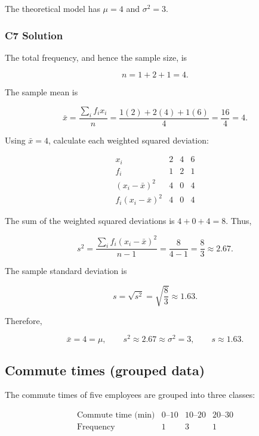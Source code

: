 The theoretical model has $\mu=4$ and $\sigma^2=3$.


\subsubsection*{C7 Solution}
\label{subsec:c7-only-frequency-solution}

The total frequency, and hence the sample size, is

\[
n=1+2+1=4.
\]

The sample mean is

\[
\bar{x}
=\frac{\sum_i f_i x_i}{n}
=\frac{1(2)+2(4)+1(6)}{4}
=\frac{16}{4}
=4.
\]

Using $\bar{x}=4$, calculate each weighted squared deviation:

\[
\begin{array}{c|ccc}
	x_i & 2 & 4 & 6 \\ \hline
	f_i & 1 & 2 & 1 \\
	(x_i-\bar{x})^2 & 4 & 0 & 4 \\
	f_i(x_i-\bar{x})^2 & 4 & 0 & 4
\end{array}
\]

The sum of the weighted squared deviations is $4+0+4=8$. Thus,

\[
s^2
=\frac{\sum_i f_i(x_i-\bar{x})^2}{n-1}
=\frac{8}{4-1}
=\frac83
\approx2.67.
\]

The sample standard deviation is

\[
s=\sqrt{s^2}=\sqrt{\frac83}\approx1.63.
\]

Therefore,

\[
\boxed{\bar{x}=4=\mu,\qquad
s^2\approx2.67\approx\sigma^2=3,\qquad s\approx1.63.}
\]


\subsection{Commute times (grouped data)}
\label{sec:c7-only-grouped}

The commute times of five employees are grouped into three classes:

\[
\begin{array}{c|ccc}
	\text{Commute time (min)} & 0\text{--}10 & 10\text{--}20 & 20\text{--}30 \\ \hline
	\text{Frequency} & 1 & 3 & 1
\end{array}
\]

